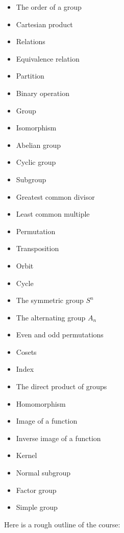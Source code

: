 \begin{itemize}
\tightlist
\item
  The order of a group
\item
  Cartesian product
\item
  Relations
\item
  Equivalence relation
\item
  Partition
\item
  Binary operation
\item
  Group
\item
  Isomorphism
\item
  Abelian group
\item
  Cyclic group
\item
  Subgroup
\item
  Greatest common divisor
\item
  Least common multiple
\item
  Permutation
\item
  Transposition
\item
  Orbit
\item
  Cycle
\item
  The symmetric group \(S^{n}\)
\item
  The alternating group \(A_{n}\)
\item
  Even and odd permutations
\item
  Cosets
\item
  Index
\item
  The direct product of groups
\item
  Homomorphism
\item
  Image of a function
\item
  Inverse image of a function
\item
  Kernel
\item
  Normal subgroup
\item
  Factor group
\item
  Simple group
\end{itemize}

Here is a rough outline of the course:

